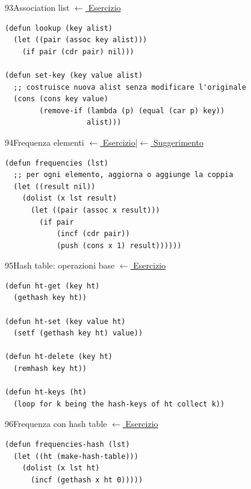 
\label{sol:93}
\begin{solbox}{93}{Association list}
\small\color{black!55}\hyperref[ex:93]{$\leftarrow$ Esercizio}\normalsize\color{black}
\begin{lstlisting}
(defun lookup (key alist)
  (let ((pair (assoc key alist)))
    (if pair (cdr pair) nil)))

(defun set-key (key value alist)
  ;; costruisce nuova alist senza modificare l'originale
  (cons (cons key value)
        (remove-if (lambda (p) (equal (car p) key))
                   alist)))
\end{lstlisting}
\end{solbox}

\label{sol:94}
\begin{solbox}{94}{Frequenza elementi}
\small\color{black!55}\hyperref[ex:94]{$\leftarrow$ Esercizio}\enspace\textcolor{black!30}{|}\enspace\hyperref[hint:94]{$\leftarrow$ Suggerimento}\normalsize\color{black}
\begin{lstlisting}
(defun frequencies (lst)
  ;; per ogni elemento, aggiorna o aggiunge la coppia
  (let ((result nil))
    (dolist (x lst result)
      (let ((pair (assoc x result)))
        (if pair
            (incf (cdr pair))
            (push (cons x 1) result))))))
\end{lstlisting}
\end{solbox}

\label{sol:95}
\begin{solbox}{95}{Hash table: operazioni base}
\small\color{black!55}\hyperref[ex:95]{$\leftarrow$ Esercizio}\normalsize\color{black}
\begin{lstlisting}
(defun ht-get (key ht)
  (gethash key ht))

(defun ht-set (key value ht)
  (setf (gethash key ht) value))

(defun ht-delete (key ht)
  (remhash key ht))

(defun ht-keys (ht)
  (loop for k being the hash-keys of ht collect k))
\end{lstlisting}
\end{solbox}

\label{sol:96}
\begin{solbox}{96}{Frequenza con hash table}
\small\color{black!55}\hyperref[ex:96]{$\leftarrow$ Esercizio}\normalsize\color{black}
\begin{lstlisting}
(defun frequencies-hash (lst)
  (let ((ht (make-hash-table)))
    (dolist (x lst ht)
      (incf (gethash x ht 0)))))
\end{lstlisting}
\end{solbox}

